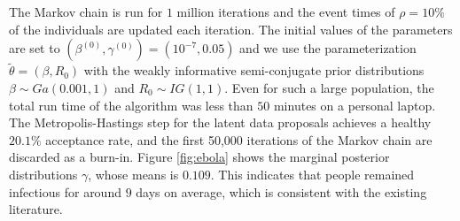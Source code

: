 \documentclass[11pt]{article}
\begin{document}
	The Markov chain is run for $1$ million iterations and the event times of $\rho=10\%$ of the individuals are updated each iteration. The initial values of the parameters are set to $(\beta^{(0)}, \gamma^{(0)}) = (10^{-7}, 0.05)$ and we use the parameterization $\tilde{\theta} = (\beta, R_0)$ with the weakly informative semi-conjugate prior distributions $\beta \sim Ga(0.001, 1)$ and $R_0 \sim IG(1,1)$. Even for such a large population, the total run time of the algorithm was less than $50$ minutes on a personal laptop.
	The Metropolis-Hastings step for the latent data proposals achieves a healthy $20.1\%$ acceptance rate, and the first 50,000 iterations of the Markov chain are discarded as a burn-in.
	Figure \ref{fig:ebola} shows the marginal posterior distributions $\gamma$, whose means is $0.109$. This indicates that people remained infectious for around $9$ days on average, which is consistent with the existing literature. 
	
	
	
\end{document}
